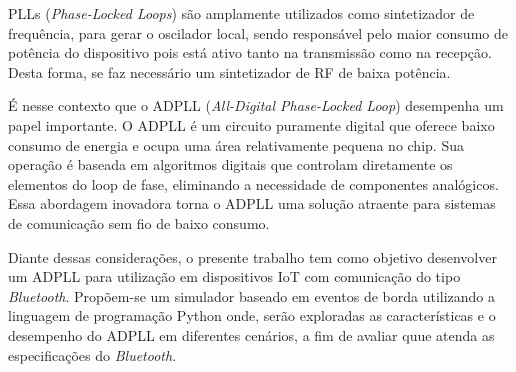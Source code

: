 PLLs (\textit{Phase-Locked Loops}) são amplamente utilizados como sintetizador de frequência, para gerar o oscilador local, sendo responsável pelo maior consumo de potência do dispositivo pois está ativo tanto na transmissão como na recepção. Desta forma, se faz necessário um sintetizador de RF de baixa potência.

É nesse contexto que o ADPLL (\textit{All-Digital Phase-Locked Loop}) desempenha um papel importante. O ADPLL é um circuito puramente digital que oferece baixo consumo de energia e ocupa uma área relativamente pequena no chip. Sua operação é baseada em algoritmos digitais que controlam diretamente os elementos do loop de fase, eliminando a necessidade de componentes analógicos. Essa abordagem inovadora torna o ADPLL uma solução atraente para sistemas de comunicação sem fio de baixo consumo.

Diante dessas considerações, o presente trabalho tem como objetivo desenvolver um ADPLL para utilização em dispositivos IoT com comunicação do tipo \textit{Bluetooth}.  Propõem-se um simulador baseado em eventos de borda utilizando a linguagem de programação Python onde, serão exploradas as características e o desempenho do ADPLL em diferentes cenários, a fim de avaliar quue atenda as especificações do \textit{Bluetooth}.

